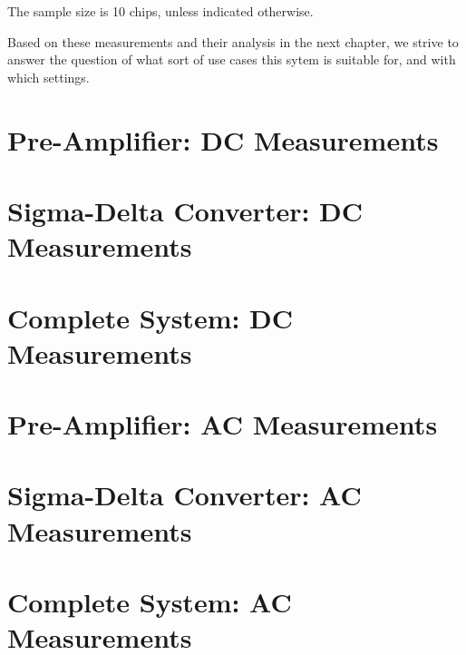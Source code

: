 The sample size is 10 chips, unless indicated otherwise.

Based on these measurements and their  analysis in the next chapter, we strive
to answer the question  of what sort of use cases this  sytem is suitable for,
and with which settings.



\section{Pre-Amplifier: DC Measurements}
\label{sec:preAmpDC}

\section{Sigma-Delta Converter: DC Measurements}
\label{sec:sigdelDC}

\section{Complete System: DC Measurements}
\label{sec:systemDC}

\section{Pre-Amplifier: AC Measurements}
\label{sec:preAmpAC}

\section{Sigma-Delta Converter: AC Measurements}
\label{sec:sigdelAC}

\section{Complete System: AC Measurements}
\label{sec:systemAC}
